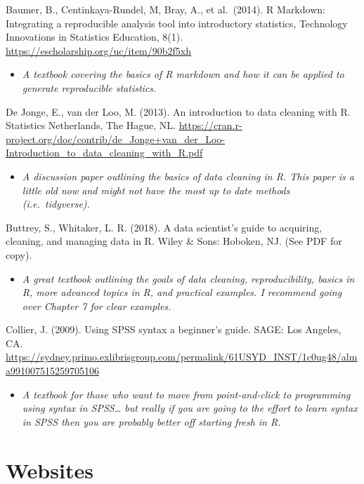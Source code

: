 \documentclass[
]{book}
\providecommand{\tightlist}{%
  \setlength{\itemsep}{0pt}\setlength{\parskip}{0pt}}
\begin{document}
Baumer, B., Centinkaya-Rundel, M, Bray, A., et al.~(2014). R Markdown: Integrating a reproducible analysis tool into introductory statistics, Technology Innovations in Statistics Education, 8(1). \url{https://escholarship.org/uc/item/90b2f5xh}

\begin{itemize}
\tightlist
\item
  \emph{A textbook covering the basics of R markdown and how it can be applied to generate reproducible statistics.}
\end{itemize}

De Jonge, E., van der Loo, M. (2013). An introduction to data cleaning with R. Statistics Netherlands, The Hague, NL. \url{https://cran.r-project.org/doc/contrib/de_Jonge+van_der_Loo-Introduction_to_data_cleaning_with_R.pdf}

\begin{itemize}
\tightlist
\item
  \emph{A discussion paper outlining the basics of data cleaning in R. This paper is a little old now and might not have the most up to date methods (i.e.~tidyverse).}
\end{itemize}

Buttrey, S., Whitaker, L. R. (2018). A data scientist's guide to acquiring, cleaning, and managing data in R. Wiley \& Sons: Hoboken, NJ. (See PDF for copy).

\begin{itemize}
\tightlist
\item
  \emph{A great textbook outlining the goals of data cleaning, reproducibility, basics in R, more advanced topics in R, and practical examples. I recommend going over Chapter 7 for clear examples.}
\end{itemize}

Collier, J. (2009). Using SPSS syntax a beginner's guide. SAGE: Los Angeles, CA. \url{https://sydney.primo.exlibrisgroup.com/permalink/61USYD_INST/1c0ug48/alma991007515259705106}

\begin{itemize}
\tightlist
\item
  \emph{A textbook for those who want to move from point-and-click to programming using syntax in SPSS\ldots{} but really if you are going to the effort to learn syntax in SPSS then you are probably better off starting fresh in R.}
\end{itemize}

\section{Websites}\label{websites}
\end{document}
